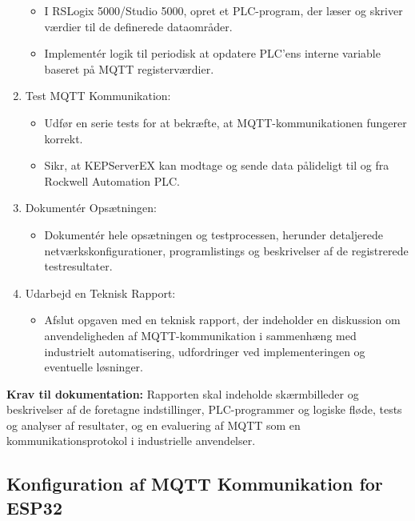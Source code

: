 \begin{enumerate}
\begin{itemize}
		\item I RSLogix 5000/Studio 5000, opret et PLC-program, der læser og skriver værdier til de definerede dataområder.
		\item Implementér logik til periodisk at opdatere PLC'ens interne variable baseret på MQTT registerværdier.
	\end{itemize}
	\item Test MQTT Kommunikation:
	\begin{itemize}
		\item Udfør en serie tests for at bekræfte, at MQTT-kommunikationen fungerer korrekt.
		\item Sikr, at KEPServerEX kan modtage og sende data pålideligt til og fra Rockwell Automation PLC.
	\end{itemize}
	\item Dokumentér Opsætningen:
	\begin{itemize}
		\item Dokumentér hele opsætningen og testprocessen, herunder detaljerede netværkskonfigurationer, programlistings og beskrivelser af de registrerede testresultater.
	\end{itemize}
	\item Udarbejd en Teknisk Rapport:
	\begin{itemize}
		\item Afslut opgaven med en teknisk rapport, der indeholder en diskussion om anvendeligheden af MQTT-kommunikation i sammenhæng med industrielt automatisering, udfordringer ved implementeringen og eventuelle løsninger.
	\end{itemize}
\end{enumerate}
\textbf{Krav til dokumentation:} Rapporten skal indeholde skærmbilleder og beskrivelser af de foretagne indstillinger, PLC-programmer og logiske fløde, tests og analyser af resultater, og en evaluering af MQTT som en kommunikationsprotokol i industrielle anvendelser.

\subsection*{Konfiguration af MQTT Kommunikation for ESP32}
\label{subsec:mqtt_comm_esp32}

